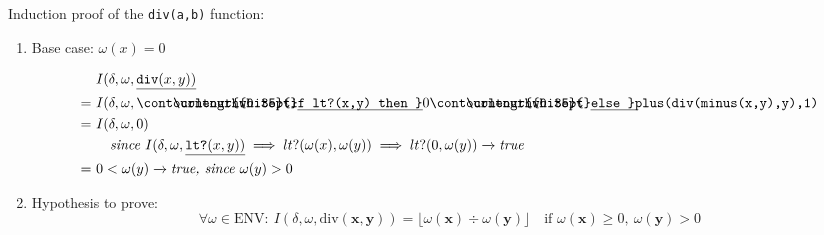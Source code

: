 \documentclass[10pt, a4paper]{article}
\newcommand{\ul}[1]{%
  \begingroup%
  \renewcommand{\ULdepth}{2.1pt}%
  \contourlength{0.35pt}%
  \uline{\phantom{#1}}\llap{\contour{white}{#1}}%
  \endgroup%
}
\newcommand{\Prog}[1]{\texttt{\ul{#1}}}
\newcommand{\ifThenElse}[3]{\Prog{if #1 then } #2 \Prog{ else } #3}
\begin{document}
Induction proof of the \texttt{div(a,b)} function:
\begin{enumerate}
    \item Base case: $\omega(x)=0$

\begin{align*}
& I(\delta, \omega, \underline{\texttt{div}(x, y))} \\
    = \ & I(\delta, \omega, \ifThenElse{lt?(x,y)}{0}{\texttt{plus(div(minus(x,y),y),1)}} \\
= \ & I(\delta, \omega, 0) \\
& \quad \textit{since } I(\delta, \omega, \underline{\texttt{lt?}(x, y))} \implies lt?(\omega(x), \omega(y)) \implies lt?(0, \omega(y)) \xrightarrow{} \textit{true} \\
= \ & 0 < \omega(y) \xrightarrow{} \textit{true, since $\omega(y)>0$} \\
\end{align*}   
\item Hypothesis to prove: 
\[
\forall \omega \in \mathrm{ENV}:\ I(\delta, \omega, \mathrm{div}(\mathbf{x}, \mathbf{y})) = \lfloor \omega(\mathbf{x}) \div \omega(\mathbf{y}) \rfloor \quad \text{if } \omega(\mathbf{x}) \geq 0,\ \omega(\mathbf{y}) > 0
\]


\end{enumerate}
\end{document}
